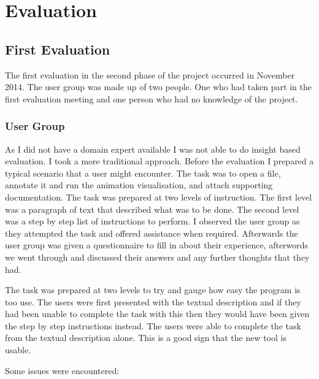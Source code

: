 \section{Evaluation}

\subsection{First Evaluation}

The first evaluation in the second phase of the project occurred in November 2014.  The user group was made up of two people.  One who had taken part in the first evaluation meeting and one person who had no knowledge of the project.

\subsubsection{User Group}

As I did not have a domain expert available I was not able to do insight based evaluation.  I took a more traditional approach.  Before the evaluation I prepared a typical scenario that a user might encounter.  The task was to open a file, annotate it and run the animation visualisation, and attach supporting documentation.  The task was prepared at two levels of instruction.  The first level was a paragraph of text that described what was to be done.  The second level was a step by step list of instructions to perform.  I observed the user group as they attempted the task and offered assistance when required.  Afterwards the user group was given a questionnaire to fill in about their experience, afterwords we went through and discussed their answers and any further thoughts that they had.

The task was prepared at two levels to try and gauge how easy the program is too use.  The users were first presented with the textual description and if they had been unable to complete the task with this then they would have been given the step by step instructions instead.  The users were able to complete the task from the textual description alone.  This is a good sign that the new tool is usable.

Some issues were encountered:

